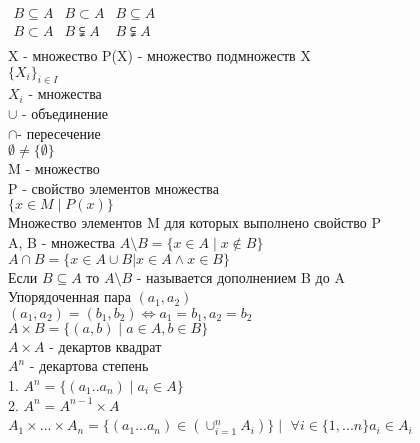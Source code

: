 $ 
\begin{matrix}
B \subseteq A & B \subset A & B \subseteq A \\
B \subset A & B \subsetneqq A & B \subsetneqq A \\
\end{matrix}
$\\
X - множество 
P(X) - множество подмножеств X\\
$ \{X_i\}_{i \in I} $\\
$ X_i $ - множества\\
$\cup$ - объединение\\
$\cap $- пересечение\\

$ \emptyset \neq \{ \emptyset \} $ \\
M - множество \\
P - свойство элементов множества \\
$ \{ x\in M \mid P(x) \} $ \\
Множество элементов M для которых выполнено свойство P \\
A, B - множества
$ A \setminus B = \{ x \in A \mid x \notin B \} $ \\
$ A \cap B = \{ x \in A \cup B | x \in A \wedge x \in B \} $ \\
Если $ B \subseteq A $ то $ A \setminus B $ - называется дополнением B до A\\
Упорядоченная пара
$ ( a_1, a_2 ) $ \\
$ (a_1 , a_2 ) = ( b_1, b_2 ) \Leftrightarrow a_1 = b_1, a_2 = b_2 $\\
$ A \times B = \{ (a, b) \mid a \in A, b \in B \} $ \\
$ A \times A $ - декартов квадрат \\
$ A^n $ - декартова степень \\
1. $A^n = \{ (a_1 .. a_n ) \mid a_i \in A \} $ \\
2. $ A^n = A^{n-1} \times A  $ \\
$ A_1 \times ... \times A_n = \{ (a_1 ... a_n ) \in (\cup_{i=1}^n A_i) \} \mid $
$ \forall i \in \{1, ... n\} a_i \in A_i $ \\


